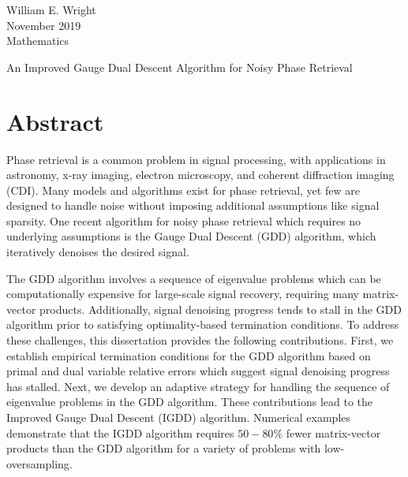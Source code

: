 {\singlespacing
   \begin{flushright}
      William E. Wright \\
      November 2019 \\
      Mathematics \\
   \end{flushright}
}

\bigskip

\begin{center}
   An Improved Gauge Dual Descent Algorithm for Noisy Phase Retrieval \\
\end{center}

\section*{Abstract}

Phase retrieval is a common problem in signal processing, with applications in astronomy, x-ray imaging, electron microscopy, and coherent diffraction imaging (CDI).
Many models and algorithms exist for phase retrieval,
yet few are designed to handle noise without imposing additional assumptions like signal sparsity.  
One recent algorithm for noisy phase retrieval which requires no underlying assumptions is the Gauge Dual Descent (GDD) algorithm, which iteratively denoises the desired signal.

The GDD algorithm involves a sequence of eigenvalue problems which can be computationally expensive for large-scale signal recovery, requiring many matrix-vector products.
Additionally, signal denoising progress tends to stall in the GDD algorithm prior to satisfying optimality-based termination conditions.
To address these challenges, this dissertation provides the following contributions.
First, we establish empirical termination conditions for the GDD algorithm based on primal and dual variable relative errors which suggest signal denoising progress has stalled.
Next, we develop an adaptive strategy for handling the sequence of eigenvalue problems in the GDD algorithm.
These contributions lead to the Improved Gauge Dual Descent (IGDD) algorithm.
Numerical examples demonstrate that the IGDD algorithm requires $50-80\%$ fewer matrix-vector products than the GDD algorithm for a variety of problems with low-oversampling.

